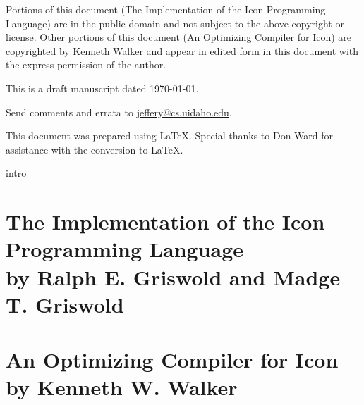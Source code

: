 \documentclass[letterpaper,twoside,12pt]{book}
\begin{document}
Portions of this document ({\textquotedbl}The Implementation of the
Icon Programming Language{\textquotedbl}) are in the public domain and
not subject to the above copyright or license. Other portions of this
document ({\textquotedbl}An Optimizing Compiler for
Icon{\textquotedbl}) are copyrighted by Kenneth Walker and appear in
edited form in this document with the express permission of the
author.


\bigskip
\raggedbottom

\noindent This is a draft manuscript dated \today.

\noindent Send comments and errata to
\href{mailto:jeffery@cs.uidaho.edu}{jeffery@cs.uidaho.edu}.

\bigskip

\noindent This document was prepared using \LaTeX. Special thanks to Don Ward
for assistance with the conversion to \LaTeX.

\setcounter{tocdepth}{4}
\tableofcontents


\mainmatter
 {intro}

%
\part[The Implementation of the Icon Programming Language]%
{The Implementation of the Icon Programming Language\\
{\large by Ralph E. Griswold and Madge T. Griswold}}














\part[An Optimizing Compiler for Icon]%
{An Optimizing Compiler for Icon\\{\large by Kenneth W. Walker}}
\end{document}
